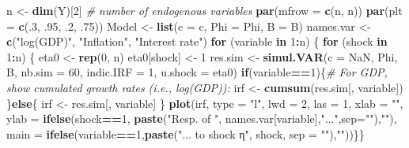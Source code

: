 \documentclass[
  11pt,
]{book}
\newenvironment{Shaded}{\begin{snugshade}}{\end{snugshade}}
\newcommand{\AttributeTok}[1]{\textcolor[rgb]{0.13,0.29,0.53}{#1}}
\newcommand{\CommentTok}[1]{\textcolor[rgb]{0.56,0.35,0.01}{\textit{#1}}}
\newcommand{\ConstantTok}[1]{\textcolor[rgb]{0.56,0.35,0.01}{#1}}
\newcommand{\ControlFlowTok}[1]{\textcolor[rgb]{0.13,0.29,0.53}{\textbf{#1}}}
\newcommand{\DecValTok}[1]{\textcolor[rgb]{0.00,0.00,0.81}{#1}}
\newcommand{\FunctionTok}[1]{\textcolor[rgb]{0.13,0.29,0.53}{\textbf{#1}}}
\newcommand{\NormalTok}[1]{#1}
\newcommand{\OtherTok}[1]{\textcolor[rgb]{0.56,0.35,0.01}{#1}}
\newcommand{\SpecialCharTok}[1]{\textcolor[rgb]{0.81,0.36,0.00}{\textbf{#1}}}
\newcommand{\StringTok}[1]{\textcolor[rgb]{0.31,0.60,0.02}{#1}}
\theoremstyle{definition}
\theoremstyle{definition}
\theoremstyle{definition}
\theoremstyle{definition}
\theoremstyle{remark}
\begin{document}
\begin{Shaded}
\begin{Highlighting}[]
\NormalTok{n }\OtherTok{\textless{}{-}} \FunctionTok{dim}\NormalTok{(Y)[}\DecValTok{2}\NormalTok{] }\CommentTok{\# number of endogenous variables}
\FunctionTok{par}\NormalTok{(}\AttributeTok{mfrow =} \FunctionTok{c}\NormalTok{(n, n))}
\FunctionTok{par}\NormalTok{(}\AttributeTok{plt =} \FunctionTok{c}\NormalTok{(.}\DecValTok{3}\NormalTok{, .}\DecValTok{95}\NormalTok{, .}\DecValTok{2}\NormalTok{, .}\DecValTok{75}\NormalTok{))}
\NormalTok{Model }\OtherTok{\textless{}{-}} \FunctionTok{list}\NormalTok{(}\AttributeTok{c =}\NormalTok{ c, }\AttributeTok{Phi =}\NormalTok{ Phi, }\AttributeTok{B =}\NormalTok{ B)}
\NormalTok{names.var }\OtherTok{\textless{}{-}} \FunctionTok{c}\NormalTok{(}\StringTok{"log(GDP)"}\NormalTok{, }\StringTok{"Inflation"}\NormalTok{, }\StringTok{"Interest rate"}\NormalTok{)}
\ControlFlowTok{for}\NormalTok{ (variable }\ControlFlowTok{in} \DecValTok{1}\SpecialCharTok{:}\NormalTok{n) \{}
  \ControlFlowTok{for}\NormalTok{ (shock }\ControlFlowTok{in} \DecValTok{1}\SpecialCharTok{:}\NormalTok{n) \{}
\NormalTok{    eta0 }\OtherTok{\textless{}{-}} \FunctionTok{rep}\NormalTok{(}\DecValTok{0}\NormalTok{, n)}
\NormalTok{    eta0[shock] }\OtherTok{\textless{}{-}} \DecValTok{1}
\NormalTok{    res.sim }\OtherTok{\textless{}{-}} \FunctionTok{simul.VAR}\NormalTok{(}\AttributeTok{c =} \ConstantTok{NaN}\NormalTok{, Phi, B, }\AttributeTok{nb.sim =} \DecValTok{60}\NormalTok{, }\AttributeTok{indic.IRF =} \DecValTok{1}\NormalTok{,}
                         \AttributeTok{u.shock =}\NormalTok{ eta0)}
    \ControlFlowTok{if}\NormalTok{(variable}\SpecialCharTok{==}\DecValTok{1}\NormalTok{)\{}\CommentTok{\# For GDP, show cumulated growth rates (i.e., log(GDP)):}
\NormalTok{      irf }\OtherTok{\textless{}{-}} \FunctionTok{cumsum}\NormalTok{(res.sim[, variable])}
\NormalTok{    \}}\ControlFlowTok{else}\NormalTok{\{}
\NormalTok{      irf }\OtherTok{\textless{}{-}}\NormalTok{ res.sim[, variable]}
\NormalTok{    \}}
    \FunctionTok{plot}\NormalTok{(irf, }\AttributeTok{type =} \StringTok{"l"}\NormalTok{, }\AttributeTok{lwd =} \DecValTok{2}\NormalTok{, }\AttributeTok{las =} \DecValTok{1}\NormalTok{,}
         \AttributeTok{xlab =} \StringTok{""}\NormalTok{, }\AttributeTok{ylab =} \FunctionTok{ifelse}\NormalTok{(shock}\SpecialCharTok{==}\DecValTok{1}\NormalTok{,}
                                  \FunctionTok{paste}\NormalTok{(}\StringTok{"Resp. of "}\NormalTok{,}
\NormalTok{                                        names.var[variable],}\StringTok{"..."}\NormalTok{,}\AttributeTok{sep=}\StringTok{""}\NormalTok{),}\StringTok{""}\NormalTok{),}
         \AttributeTok{main =} \FunctionTok{ifelse}\NormalTok{(variable}\SpecialCharTok{==}\DecValTok{1}\NormalTok{,}\FunctionTok{paste}\NormalTok{(}\StringTok{"... to shock η"}\NormalTok{, shock, }\AttributeTok{sep =} \StringTok{""}\NormalTok{),}\StringTok{""}\NormalTok{))\}\}}
\end{Highlighting}
\end{Shaded}
\end{document}
